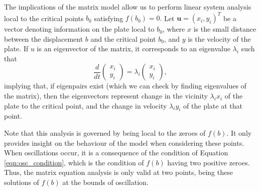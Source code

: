 \documentclass{report}
\begin{document}
The implications of the matrix model allow us to perform linear system analysis local to the critical points $b_0$ satisfying $f(b_0) = 0.$
Let $\mathbf{u}=(x_i,y_i)^T$ be a vector denoting information on the plate local to $b_0$,
where $x$ is the small distance between the displacement $b$ and the critical point $b_0$,
and $y$ is the velocity of the plate.
If $u$ is an eigenvector of the matrix,
it corresponds to an eigenvalue $\lambda_i$ such that
\begin{equation}
	\frac{d}{dt} \begin{pmatrix}
		x_i \\
		y_i
	\end{pmatrix} = \lambda_i \begin{pmatrix}
	    x_i \\
	    y_i
    \end{pmatrix},
\label{eqn:matrix_eigenvectors}
\end{equation}
implying that, if eigenpairs exist (which we can check by finding eigenvalues of the matrix),
then the eigenvectors represent change in the vicinity $\lambda_i x_i$ of the plate to the critical point,
and the change in velocity $\lambda_i y_i$ of the plate at that point.

Note that this analysis is governed by being local to the zeroes of $f(b)$.
It only provides insight on the behaviour of the model when considering these points.
When oscillations occur, it is a consequence of the condition of Equation \ref{eqn:osc_condition},
which is the condition of $f(b)$ having two positive zeroes.
Thus, the matrix equation analysis is only valid at two points,
being these solutions of $f(b)$ at the bounds of oscillation.
\end{document}

